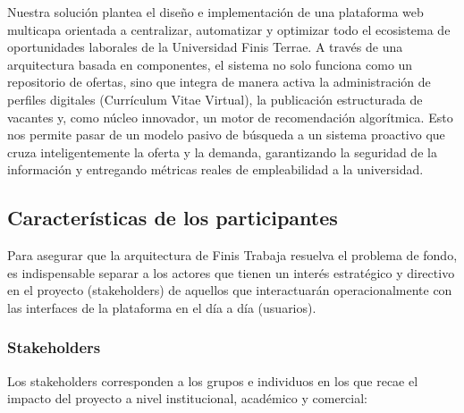 \documentclass[11pt,a4paper]{Plantilla}
\begin{document}
Nuestra solución plantea el diseño e implementación de una plataforma web multicapa orientada a centralizar, automatizar y optimizar todo el ecosistema de oportunidades laborales de la Universidad Finis Terrae. A través de una arquitectura basada en componentes, el sistema no solo funciona como un repositorio de ofertas, sino que integra de manera activa la administración de perfiles digitales (Currículum Vitae Virtual), la publicación estructurada de vacantes y, como núcleo innovador, un motor de recomendación algorítmica. Esto nos permite pasar de un modelo pasivo de búsqueda a un sistema proactivo que cruza inteligentemente la oferta y la demanda, garantizando la seguridad de la información y entregando métricas reales de empleabilidad a la universidad.

\subsection{Características de los participantes}%

Para asegurar que la arquitectura de Finis Trabaja resuelva el problema de fondo, es indispensable separar a los actores que tienen un interés estratégico y directivo en el proyecto (stakeholders) de aquellos que interactuarán operacionalmente con las interfaces de la plataforma en el día a día (usuarios).

\subsubsection{Stakeholders}%

Los stakeholders corresponden a los grupos e individuos en los que recae el impacto del proyecto a nivel institucional, académico y comercial:
\end{document}
